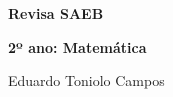               \vspace*{\fill}
              \begin{center}
              {\HUGE\textbf{Revisa SAEB}}\bigskip

              {\LARGE\textbf{2º ano: Matemática}}

              \bigskip
              \bigskip
              \bigskip

              {\Large
                            Eduardo Toniolo Campos

                            }
              \end{center}
              \vspace*{\fill}

\endgroup
\pagebreak
